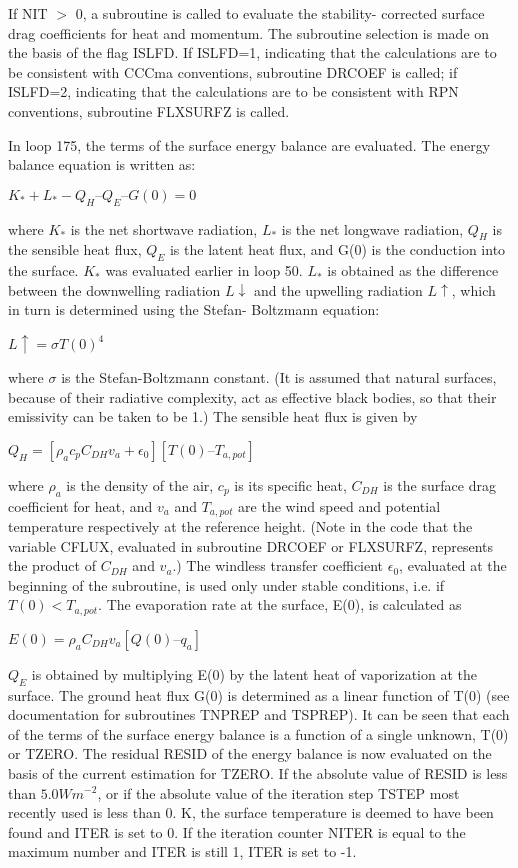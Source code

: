 If N\+I\+T $>$ 0, a subroutine is called to evaluate the stability-\/ corrected surface drag coefficients for heat and momentum. The subroutine selection is made on the basis of the flag I\+S\+L\+F\+D. If I\+S\+L\+F\+D=1, indicating that the calculations are to be consistent with C\+C\+Cma conventions, subroutine D\+R\+C\+O\+E\+F is called; if I\+S\+L\+F\+D=2, indicating that the calculations are to be consistent with R\+P\+N conventions, subroutine F\+L\+X\+S\+U\+R\+F\+Z is called.

In loop 175, the terms of the surface energy balance are evaluated. The energy balance equation is written as\+:

$K_* + L_* - Q_H – Q_E – G(0) = 0$

where $K_*$ is the net shortwave radiation, $L_*$ is the net longwave radiation, $Q_H$ is the sensible heat flux, $Q_E$ is the latent heat flux, and G(0) is the conduction into the surface. $K_*$ was evaluated earlier in loop 50. $L_*$ is obtained as the difference between the downwelling radiation $L \downarrow$ and the upwelling radiation $L \uparrow$, which in turn is determined using the Stefan-\/ Boltzmann equation\+:

$L \uparrow = \sigma T(0)^4$

where $\sigma$ is the Stefan-\/\+Boltzmann constant. (It is assumed that natural surfaces, because of their radiative complexity, act as effective black bodies, so that their emissivity can be taken to be 1.) The sensible heat flux is given by

$Q_H = [\rho_a c_p C_{DH} v_a + \epsilon_0] [T(0) – T_{a,pot}]$

where $\rho_a$ is the density of the air, $c_p$ is its specific heat, $C_{DH}$ is the surface drag coefficient for heat, and $v_a$ and $T_{a,pot}$ are the wind speed and potential temperature respectively at the reference height. (Note in the code that the variable C\+F\+L\+U\+X, evaluated in subroutine D\+R\+C\+O\+E\+F or F\+L\+X\+S\+U\+R\+F\+Z, represents the product of $C_{DH}$ and $v_a$.) The windless transfer coefficient $\epsilon_0$, evaluated at the beginning of the subroutine, is used only under stable conditions, i.\+e. if $T(0) < T_{a,pot}$. The evaporation rate at the surface, E(0), is calculated as

$E(0) = \rho_a C_{DH} v_a [Q(0) – q_a]$

$Q_E$ is obtained by multiplying E(0) by the latent heat of vaporization at the surface. The ground heat flux G(0) is determined as a linear function of T(0) (see documentation for subroutines T\+N\+P\+R\+E\+P and T\+S\+P\+R\+E\+P). It can be seen that each of the terms of the surface energy balance is a function of a single unknown, T(0) or T\+Z\+E\+R\+O. The residual R\+E\+S\+I\+D of the energy balance is now evaluated on the basis of the current estimation for T\+Z\+E\+R\+O. If the absolute value of R\+E\+S\+I\+D is less than $5.0 W m^{-2}$, or if the absolute value of the iteration step T\+S\+T\+E\+P most recently used is less than 0. K, the surface temperature is deemed to have been found and I\+T\+E\+R is set to 0. If the iteration counter N\+I\+T\+E\+R is equal to the maximum number and I\+T\+E\+R is still 1, I\+T\+E\+R is set to -\/1.

